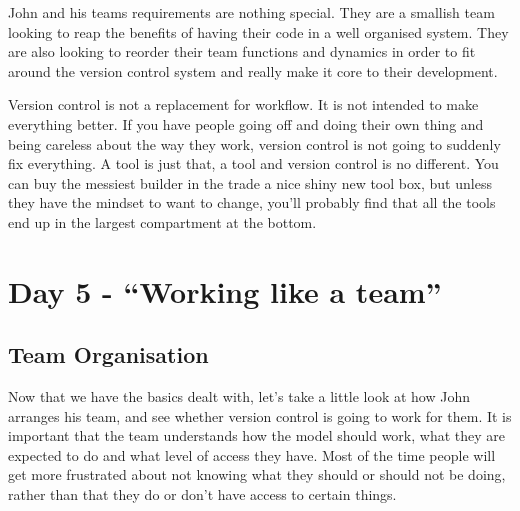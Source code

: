 John and his teams requirements are nothing special.
They are a smallish team looking to reap the benefits of having their code in a well organised system.
They are also looking to reorder their team functions and dynamics in order to fit around the version control system and really make it core to their development.

Version control is not a replacement for workflow.
It is not intended to make everything better.
If you have people going off and doing their own thing and being careless about the way they work, version control is not going to suddenly fix everything.
A tool is just that, a tool and version control is no different.
You can buy the messiest builder in the trade a nice shiny new tool box, but unless they have the mindset to want to change, you'll probably find that all the tools end up in the largest compartment at the bottom.

\section{Day 5 - ``Working like a team''}

\subsection{Team Organisation}

Now that we have the basics dealt with, let's take a little look at how John arranges his team, and see whether version control is going to work for them.
It is important that the team understands how the model should work, what they are expected to do and what level of access they have.
Most of the time people will get more frustrated about not knowing what they should or should not be doing, rather than that they do or don't have access to certain things.

